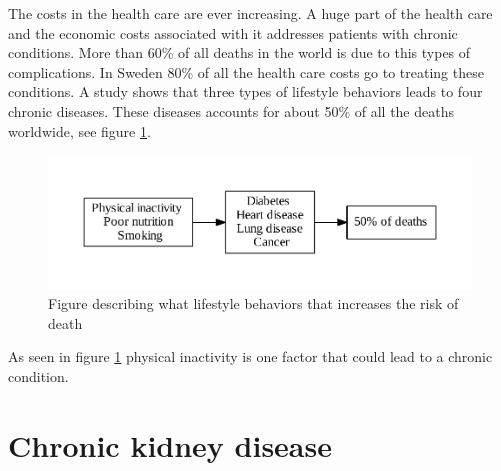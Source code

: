 \documentclass{cslthse-msc}
\begin{document}


The costs in the health care are ever increasing. A huge part of the health care and the economic costs associated with it addresses patients with chronic conditions. More than 60\% of all deaths in the world is due to this types of complications. In Sweden 80\% of all the health care costs go to treating these conditions\cite{SmartCare}. A study shows that three types of lifestyle behaviors leads to four chronic diseases. These diseases accounts for about 50\% of all the deaths worldwide, see figure \ref{fig:chronic-fig}\cite{callaway2015quantified}. 

\begin{figure}[!hbt]
\centering
\includegraphics[scale=0.8]{chronic-fig.pdf} 
\caption{Figure  describing what lifestyle behaviors that increases the risk of death}\label{fig:chronic-fig}
\end{figure}

As seen in figure \ref{fig:chronic-fig} physical inactivity is one factor that could lead to a chronic condition. 



\section{Chronic kidney disease}
\label{sec:kiney}

\end{document}
